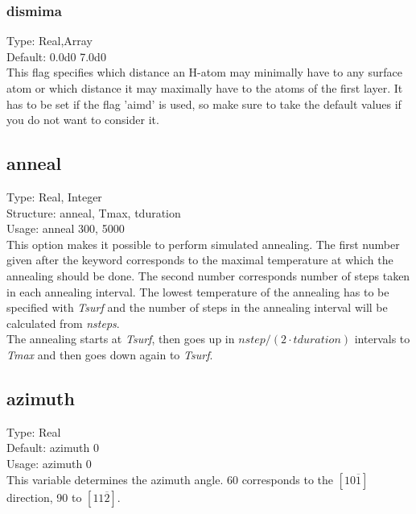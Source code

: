 \documentclass[twoside, 11pt, titlepage, captions=nooneline, a4paper, headsepline]{scrbook}%
\begin{document}
\subsubsection*{dismima}
Type: Real,Array\\
Default: 0.0d0 7.0d0\\
This flag specifies which distance an H-atom may minimally have to any surface atom or which distance it may maximally have to the atoms of the first layer. It has to be set if the flag 'aimd' is used, so make sure to take the default values if you do not want to consider it.


\subsection*{anneal}
Type: Real, Integer\\
Structure: anneal, Tmax, tduration\\
Usage: anneal 300, 5000\\
This option makes it possible to perform simulated annealing. The first number given after the keyword corresponds to the maximal temperature at which the annealing should be done. The second number corresponds number of steps taken in each annealing interval. The lowest temperature of the annealing has to be specified with \emph{Tsurf} and the number of steps in the annealing interval will be calculated from \emph{nsteps}.\\
The annealing starts at \emph{Tsurf}, then goes up in $nstep/(2\cdot tduration)$ intervals to \emph{Tmax} and then goes down again to \emph{Tsurf}.

\subsection*{azimuth}
Type: Real\\
Default: azimuth 0 \\
Usage: azimuth 0 \\
This variable determines the azimuth angle. 60 corresponds to the $\left[10\overline1\right]$ direction, 90 to $\left[11\overline2\right]$.
\end{document}
